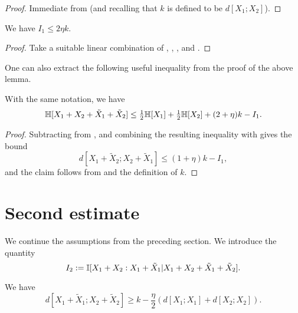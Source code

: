 \begin{proof} \leanok  Immediate from  (and recalling that $k$ is defined to be $d[X_1;X_2]$).
\end{proof}

\begin{lemma}\label{first-estimate}
  \leanok We have $I_1 \leq 2 \eta k$.
\end{lemma}

\begin{proof}\leanok  Take a suitable linear combination of , , , and .
\end{proof}

One can also extract the following useful inequality from the proof of the above lemma.

\begin{lemma}\label{foursum-bound}
  \leanok
  With the same notation, we have
  \begin{equation}
    \label{HS-bound}
    \mathbb{H}[X_1+X_2+\tilde X_1+\tilde X_2] \le \tfrac{1}{2} \mathbb{H}[X_1]+\tfrac{1}{2} \mathbb{H}[X_2] + (2 + \eta) k - I_1.
  \end{equation}
\end{lemma}

\begin{proof}\leanok
  Subtracting  from , and combining the resulting inequality with  gives the bound
\[
  d[X_1+\tilde X_2;X_2+\tilde X_1] \le (1 + \eta) k - I_1,
\]
and the claim follows from  and the definition of $k$.
\end{proof}


\section{Second estimate}

We continue the assumptions from the preceding section.
We introduce the quantity
$$ I_2 := \mathbb{I}[X_1+X_2 : X_1 + \tilde X_1 | X_1+X_2+\tilde X_1+\tilde X_2].$$

\begin{lemma}\label{dist-sums}
  \leanok
We have
$$ d[X_1+\tilde X_1; X_2+\tilde X_2] \geq k - \frac{\eta}{2} ( d[X_1; X_1] + d[X_2;X_2] ).$$
\end{lemma}

